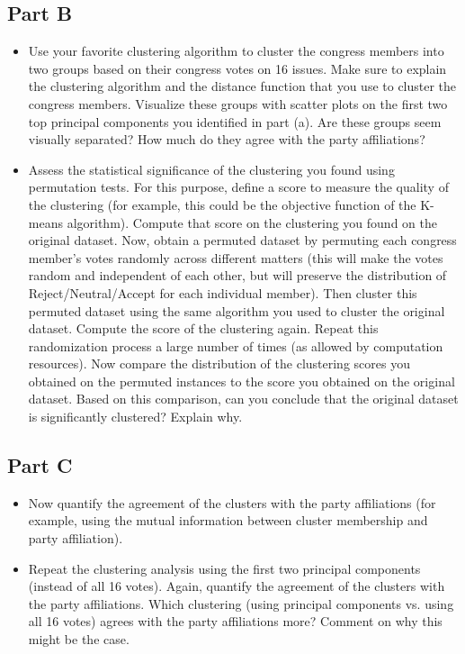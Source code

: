 \documentclass[11pt]{article}
\begin{document}
\subsection*{Part B}
\begin{itemize}
    \item
	Use your favorite clustering algorithm  to cluster the congress members into two groups based on their congress votes on 16 issues.
 Make sure to explain the clustering algorithm and the distance function that you use to cluster the congress members. 
Visualize these groups with scatter plots on the first two top principal components you identified in part (a). Are these groups seem visually separated? How much do they agree with the party affiliations? 
 
\item Assess the statistical significance of the clustering you found using permutation tests. For this purpose, define a score to measure the quality of the clustering (for example, this could be the objective function of the K-means algorithm). Compute that score on the clustering you found on the original dataset. Now, obtain a permuted dataset by permuting each congress member's votes randomly across different matters (this will make the votes random and independent of each other, but will preserve the distribution of Reject/Neutral/Accept for each individual member). Then cluster this permuted dataset using the same algorithm you used to cluster the original dataset. Compute the score of the clustering again. Repeat this randomization process a large number of times (as allowed by computation resources). Now compare the distribution of the clustering scores you obtained on the permuted instances to the score you obtained on the original dataset. Based on this comparison, can you conclude that the original dataset is significantly clustered? Explain why.  
\end{itemize}

 \subsection*{Part C}
 \begin{itemize}
 \item
Now quantify the agreement of the clusters with the party affiliations (for example, using the mutual information between cluster membership and party affiliation). 
\item
Repeat the clustering analysis using the first two principal components (instead of all 16 votes). Again, quantify the agreement of the clusters with the party affiliations. Which clustering (using principal components vs. using all 16 votes) agrees with the party affiliations more? Comment on why this might be the case. 
\end{itemize}
\end{document}
